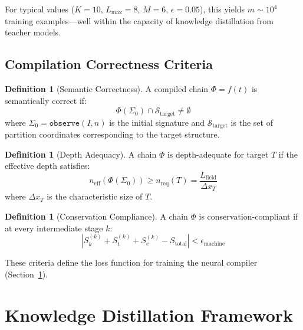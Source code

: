 \documentclass[11pt,twocolumn,a4paper]{article}
\theoremstyle{definition}
\newtheorem{definition}[theorem]{Definition}
\theoremstyle{remark}
\newcommand{\Sig}{\Sigma}
\newcommand{\Sk}{S_k}
\newcommand{\St}{S_t}
\newcommand{\Se}{S_e}
\newcommand{\morphism}{\Phi}
\begin{document}
For typical values ($K = 10$, $L_{\max} = 8$, $M = 6$, $\epsilon = 0.05$), this yields $m \sim 10^4$ training examples---well within the capacity of knowledge distillation from teacher models.

\subsection{Compilation Correctness Criteria}

\begin{definition}[Semantic Correctness]
\label{def:correctness}
A compiled chain $\morphism = f(t)$ is semantically correct if:
\begin{equation}
\morphism(\Sig_0) \cap \mathcal{S}_{\text{target}} \neq \emptyset
\end{equation}
where $\Sig_0 = \texttt{observe}(I, n)$ is the initial signature and $\mathcal{S}_{\text{target}}$ is the set of partition coordinates corresponding to the target structure.
\end{definition}

\begin{definition}[Depth Adequacy]
A chain $\morphism$ is depth-adequate for target $T$ if the effective depth satisfies:
\begin{equation}
n_{\mathrm{eff}}(\morphism(\Sig_0)) \geq n_{\mathrm{req}}(T) = \frac{L_{\mathrm{field}}}{\Delta x_T}
\end{equation}
where $\Delta x_T$ is the characteristic size of $T$.
\end{definition}

\begin{definition}[Conservation Compliance]
A chain $\morphism$ is conservation-compliant if at every intermediate stage $k$:
\begin{equation}
|\Sk^{(k)} + \St^{(k)} + \Se^{(k)} - S_{\mathrm{total}}| < \epsilon_{\mathrm{machine}}
\end{equation}
\end{definition}

These criteria define the loss function for training the neural compiler (Section~\ref{sec:distillation}).

\section{Knowledge Distillation Framework}
\label{sec:distillation}
\end{document}
